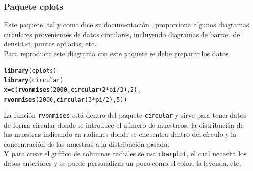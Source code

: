 \documentclass{article}\usepackage[]{graphicx}\usepackage[]{color}
\makeatletter
\newcommand{\hlnum}[1]{\textcolor[rgb]{0.686,0.059,0.569}{#1}}%
\newcommand{\hlopt}[1]{\textcolor[rgb]{0,0,0}{#1}}%
\newcommand{\hlstd}[1]{\textcolor[rgb]{0.345,0.345,0.345}{#1}}%
\newcommand{\hlkwb}[1]{\textcolor[rgb]{0.69,0.353,0.396}{#1}}%
\newcommand{\hlkwd}[1]{\textcolor[rgb]{0.737,0.353,0.396}{\textbf{#1}}}%
\newenvironment{kframe}{%
 \def\at@end@of@kframe{}%
 \ifinner\ifhmode%
  \def\at@end@of@kframe{\end{minipage}}%
  \begin{minipage}{\columnwidth}%
 \fi\fi%
 \def\FrameCommand##1{\hskip\@totalleftmargin \hskip-\fboxsep
 \colorbox{shadecolor}{##1}\hskip-\fboxsep
     \hskip-\linewidth \hskip-\@totalleftmargin \hskip\columnwidth}%
 \MakeFramed {\advance\hsize-\width
   \@totalleftmargin\z@ \linewidth\hsize
   \@setminipage}}%
 {\par\unskip\endMakeFramed%
 \at@end@of@kframe}
\newenvironment{knitrout}{}{} %
\makeatother
\begin{document}
\subsubsection{Paquete cplots}
Este paquete, tal y como dice su documentaci\'on %
, proporciona algunos diagramas circulares provenientes de datos circulares, incluyendo diagramas de barras, de densidad, puntos apilados, etc.~\\
Para reproducir este diagrama con este paquete se debe preparar los datos.
\begin{knitrout}
\color{fgcolor}\begin{kframe}
\begin{alltt}
\hlkwd{library}\hlstd{(cplots)}
\hlkwd{library}\hlstd{(circular)}
\hlstd{x} \hlkwb{=} \hlkwd{c}\hlstd{(}\hlkwd{rvonmises}\hlstd{(}\hlnum{2000}\hlstd{,} \hlkwd{circular}\hlstd{(}\hlnum{2}\hlopt{*}\hlstd{pi}\hlopt{/}\hlnum{3}\hlstd{),} \hlnum{2}\hlstd{),}
      \hlkwd{rvonmises}\hlstd{(}\hlnum{2000}\hlstd{,} \hlkwd{circular}\hlstd{(}\hlnum{3}\hlopt{*}\hlstd{pi}\hlopt{/}\hlnum{2}\hlstd{),} \hlnum{5}\hlstd{))}
\end{alltt}
\end{kframe}
\end{knitrout}
La funci\'on \texttt{rvonmises} est\'a dentro del paquete \texttt{circular} y sirve para tener datos de forma circular donde se introduce el n\'umero de muestreos, la distribuci\'on de las muestras indicando en radianes donde se encuentra dentro del c\'irculo y la concentraci\'on de las muestras a la distribuci\'on pasada.~\\
Y para crear el gr\'afico de columnas radiales se usa \texttt{cbarplot}, el cual necesita los datos anteriores y se puede personalizar un poco como el color, la leyenda, etc.
\end{document}
